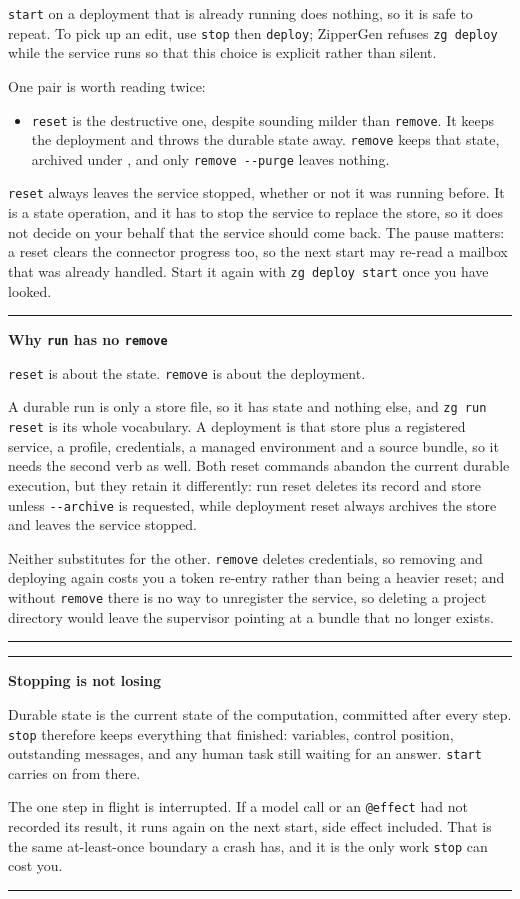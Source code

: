 \documentclass[11pt,a4paper]{article}
\newenvironment{notebox}[1]
{\begin{center}\begin{minipage}{0.94\linewidth}
 \color{ZipperInk}\hrule\vspace{5pt}\textbf{#1}\par\smallskip}
{\vspace{5pt}\hrule\end{minipage}\end{center}}
\begin{document}
\texttt{start} on a deployment that is already running does nothing, so it is
safe to repeat. To pick up an edit, use \texttt{stop} then \texttt{deploy};
ZipperGen refuses \texttt{zg deploy} while the service runs so that this choice
is explicit rather than silent.

One pair is worth reading twice:

\begin{itemize}
  \item \texttt{reset} is the destructive one, despite sounding milder than
        \texttt{remove}. It keeps the deployment and throws the durable state
        away. \texttt{remove} keeps that state, archived under
        , and only
        \texttt{remove -{}-purge} leaves nothing.
\end{itemize}

\texttt{reset} always leaves the service stopped, whether or not it was running
before. It is a state operation, and it has to stop the service to replace the
store, so it does not decide on your behalf that the service should come back.
The pause matters: a reset clears the connector progress too, so the next start
may re-read a mailbox that was already handled. Start it again with
\texttt{zg deploy start} once you have looked.

\begin{notebox}{Why \texttt{run} has no \texttt{remove}}
\texttt{reset} is about the state. \texttt{remove} is about the deployment.

A durable run is only a store file, so it has state and nothing else, and
\texttt{zg run reset} is its whole vocabulary. A deployment is that store plus
a registered service, a profile, credentials, a managed environment and a
source bundle, so it needs the second verb as well. Both reset commands abandon
the current durable execution, but they retain it differently: run reset
deletes its record and store unless \texttt{-{}-archive} is requested, while
deployment reset always archives the store and leaves the service stopped.

Neither substitutes for the other. \texttt{remove} deletes credentials, so
removing and deploying again costs you a token re-entry rather than being a
heavier reset; and without \texttt{remove} there is no way to unregister the
service, so deleting a project directory would leave the supervisor pointing at
a bundle that no longer exists.
\end{notebox}

\begin{notebox}{Stopping is not losing}
Durable state is the current state of the computation, committed after every
step. \texttt{stop} therefore keeps everything that finished: variables,
control position, outstanding messages, and any human task still waiting for an
answer. \texttt{start} carries on from there.

The one step in flight is interrupted. If a model call or an \texttt{@effect}
had not recorded its result, it runs again on the next start, side effect
included. That is the same at-least-once boundary a crash has, and it is the
only work \texttt{stop} can cost you.
\end{notebox}
\end{document}
